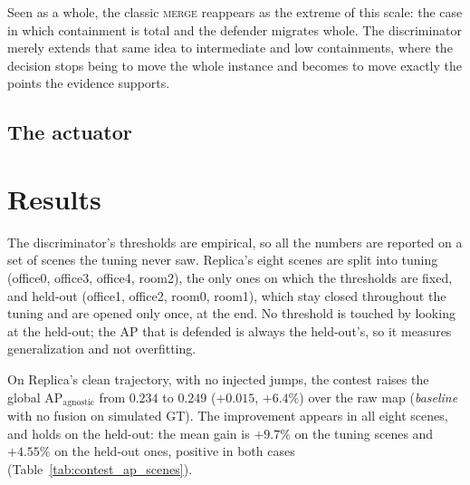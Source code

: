 \begin{otherlanguage}{english}
Seen as a whole, the classic \textsc{merge} reappears as the extreme of this scale: the case in which
containment is total and the defender migrates whole. The discriminator merely extends that same idea
to intermediate and low containments, where the decision stops being to move the whole instance and
becomes to move exactly the points the evidence supports.

\subsection{The actuator}
\label{sec:contest_actuator}

\section{Results}
\label{sec:contest_results}

The discriminator's thresholds are empirical, so all the numbers are reported on a set of scenes the
tuning never saw. Replica's eight scenes are split into tuning (office0, office3, office4, room2),
the only ones on which the thresholds are fixed, and held-out (office1, office2, room0, room1), which
stay closed throughout the tuning and are opened only once, at the end. No threshold is touched by
looking at the held-out; the $\mathrm{AP}$ that is defended is always the held-out's, so it measures
generalization and not overfitting.

On Replica's clean trajectory, with no injected jumps, the contest raises the global
$\mathrm{AP}_{\text{agnostic}}$ from $0.234$ to $0.249$ ($+0.015$, $+6.4\%$) over the raw map
(\emph{baseline} with no fusion on simulated GT). The improvement appears in all eight scenes, and
holds on the held-out: the mean gain is $+9.7\%$ on the tuning scenes and $+4.55\%$ on the held-out
ones, positive in both cases (Table~\ref{tab:contest_ap_scenes}).


\end{otherlanguage}
